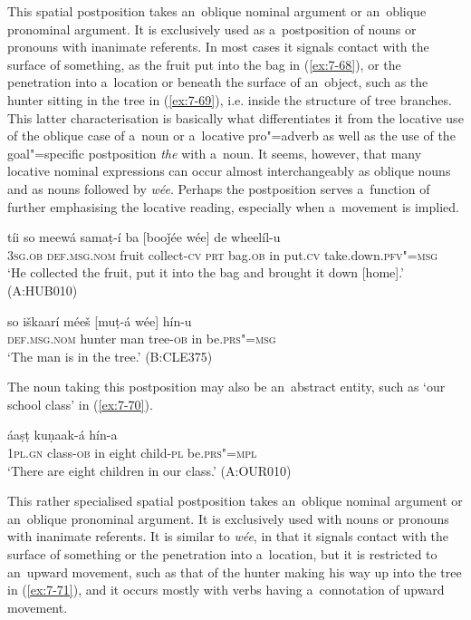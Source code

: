  This spatial postposition takes an~oblique nominal argument or an~oblique pronominal argument. It is exclusively used as a~postposition of nouns or pronouns with inanimate referents. In most cases it signals contact with the surface of something, as the fruit put into the bag in (\ref{ex:7-68}), or the penetration into a~location or beneath the surface of an~object, such as the hunter sitting in the tree in (\ref{ex:7-69}), i.e. inside the structure of tree branches. This latter characterisation is basically what differentiates it from the locative use of the oblique case of a~noun or a~locative pro"=adverb as well as the use of the goal"=specific postposition \textit{the} with a~noun. It seems, however, that many locative nominal expressions can occur almost interchangeably as oblique nouns and as nouns followed by \textit{wée}. Perhaps the postposition serves a~function of further emphasising the locative reading, especially when a~movement is implied.

\begin{exe}
\ex
\label{ex:7-68}
\gll tíi so meewá samaṭ-í ba [booǰée wée] de wheelíl-u \\
\textsc{3sg.ob} \textsc{def.msg.nom} fruit collect-\textsc{cv} \textsc{prt} bag.\textsc{ob} in  put.\textsc{cv} take.down.\textsc{pfv"=msg }\\
\glt `He collected the fruit, put it into the bag and brought it down [home].' (A:HUB010)
\end{exe}
\begin{exe}
\ex
\label{ex:7-69}
\gll so iškaarí méeš [muṭ-á wée] hín-u \\
\textsc{def.msg.nom} hunter man tree-\textsc{ob} in be.\textsc{prs"=msg} \\
\glt `The man is in the tree.' (B:CLE375)
\end{exe}

The noun taking this postposition may also be an~abstract entity, such as `our school class' in (\ref{ex:7-70}).

\begin{exe}
\ex
\label{ex:7-70}
 áaṣṭ kuṇaak-á hín-a \\
\textsc{1pl.gn} class-\textsc{ob} in eight child-\textsc{pl}  be.\textsc{prs"=mpl} \\
\glt `There are eight children in our class.' (A:OUR010)
\end{exe}


   This rather specialised spatial postposition takes an~oblique nominal argument or an~oblique pronominal argument. It is exclusively used with nouns or pronouns with inanimate referents. It is similar to \textit{wée}, in that it signals contact with the surface of something or the penetration into a~location, but it is restricted to an~upward movement, such as that of the hunter making his way up into the tree in (\ref{ex:7-71}), and it occurs mostly with verbs having a~connotation of upward movement. 

